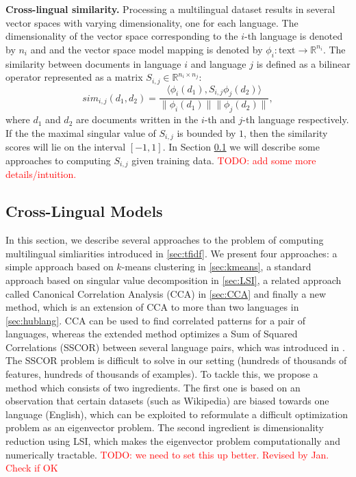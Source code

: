 \documentclass[twoside,11pt]{article}
\newcommand{\todo}[1]{\textcolor{red}{TODO: #1}}
\newcommand{\RR}{\mathbb{R}}
\begin{document}
\noindent\textbf {Cross-lingual similarity.}
Processing a multilingual dataset results in several vector spaces with varying dimensionality, one for each language. The dimensionality of the vector space corresponding to the $i$-th language is denoted by $n_i$ and and the vector space model mapping is denoted by $\phi_i : \text{text} \rightarrow \RR^{n_i}$.
The similarity between documents in language $i$ and language $j$ is defined as a bilinear operator represented as a matrix $S_{i,j} \in \RR^{n_i \times n_j}$:
$$sim_{i,j}(d_1, d_2) = \frac{ \langle \phi_i (d_1), S_{i,j} \phi_j (d_2) \rangle }{\|\phi_i(d_1)\| \|\phi_j(d_2)\|},$$
where $d_1$ and $d_2$ are documents written in the $i$-th and $j$-th language respectively. If the the maximal singular value of $S_{i,j}$ is bounded by $1$, then the similarity scores will lie on the interval $[-1, 1]$. In Section \ref{sec:models} we will describe some approaches to computing $S_{i,j}$ given training data. \todo{add some more details/intuition.}

\subsection{Cross-Lingual Models}\label{sec:models}
In this section, we describe several approaches to the problem of computing multilingual simliarities introduced in \ref{sec:tfidf}. We present four approaches:
a simple approach based on $k$-means clustering in \ref{sec:kmeans}, a standard approach based on singular value decomposition in \ref{sec:LSI}, a related
approach called Canonical Correlation Analysis (CCA) in \ref{sec:CCA} and finally a new method, which is an extension of CCA to more than two languages in \ref{sec:hublang}.
%
CCA can be used to find correlated patterns for a pair of languages, whereas the extended method optimizes a
Sum of Squared Correlations (SSCOR) between several language pairs, which was introduced in \cite{Kettenring}. The SSCOR problem is difficult to solve in our setting (hundreds of thousands of features, hundreds of thousands of examples). To tackle this, we propose a method which consists of two ingredients.
 The first one is based on an observation that certain datasets (such as Wikipedia) are biased towards one language (English), which can be exploited
 to reformulate a difficult optimization problem as an eigenvector problem. The second ingredient is dimensionality reduction using LSI, which
 makes the eigenvector problem computationally and numerically tractable. \todo{we need to set this up better. Revised by Jan. Check if OK}
\end{document}
